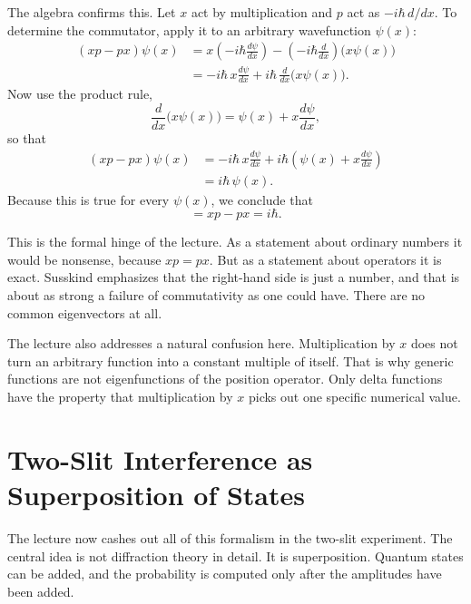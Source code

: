 The algebra confirms this. Let \(x\) act by multiplication and \(p\) act as \(-i\hbar\,d/dx\). To determine the commutator, apply it to an arbitrary wavefunction \(\psi(x)\):
\begin{align}
(xp-px)\psi(x)
  &= x\left(-i\hbar\frac{d\psi}{dx}\right)
   -\left(-i\hbar\frac{d}{dx}\right)\bigl(x\psi(x)\bigr) \\
  &= -i\hbar\,x\frac{d\psi}{dx}
   + i\hbar\,\frac{d}{dx}\bigl(x\psi(x)\bigr).
\end{align}
Now use the product rule,
\begin{equation}
\frac{d}{dx}\bigl(x\psi(x)\bigr)=\psi(x)+x\frac{d\psi}{dx},
\end{equation}
so that
\begin{align}
(xp-px)\psi(x)
  &= -i\hbar\,x\frac{d\psi}{dx}
   + i\hbar\left(\psi(x)+x\frac{d\psi}{dx}\right) \\
  &= i\hbar\,\psi(x).
\end{align}
Because this is true for every \(\psi(x)\), we conclude that
\begin{equation}
[x,p]=xp-px=i\hbar.
\end{equation}

This is the formal hinge of the lecture. As a statement about ordinary numbers it would be nonsense, because \(xp=px\). But as a statement about operators it is exact. Susskind emphasizes that the right-hand side is just a number, and that is about as strong a failure of commutativity as one could have. There are no common eigenvectors at all.

The lecture also addresses a natural confusion here. Multiplication by \(x\) does not turn an arbitrary function into a constant multiple of itself. That is why generic functions are not eigenfunctions of the position operator. Only delta functions have the property that multiplication by \(x\) picks out one specific numerical value.

\section{Two-Slit Interference as Superposition of States}

The lecture now cashes out all of this formalism in the two-slit experiment. The central idea is not diffraction theory in detail. It is superposition. Quantum states can be added, and the probability is computed only after the amplitudes have been added.

